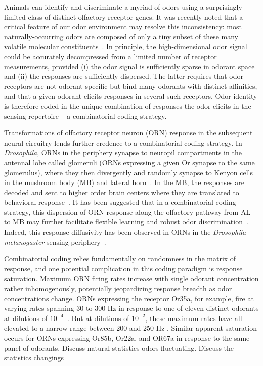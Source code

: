 
Animals can identify and discriminate a myriad of odors using a surprisingly limited class of distinct olfactory receptor genes. It was recently noted that a critical feature of our odor environment may resolve this inconsistency: most naturally-occurring odors are composed of only a tiny subset of these many volatile molecular constituents~\cite{vijay_1}. In principle, the high-dimensional odor signal could be accurately decompressed from a limited number of receptor measurements, provided (i) the odor signal is sufficiently sparse in odorant space and (ii) the responses are sufficiently dispersed. The latter requires that odor receptors are not odorant-specific but bind many odorants with distinct affinities, and that a given odorant elicits responses in several such receptors. Odor identity is therefore coded in the unique combination of responses the odor elicits in the sensing repertoire -- a combinatorial coding strategy. 

Transformations of olfactory receptor neuron (ORN) response in the subsequent neural circuitry lends further credence to a combinatorial coding strategy. In \textit{Drosophila}, ORNs in the periphery synapse to neuropil compartments in the antennal lobe called glomeruli (ORNs expressing a given Or synapse to the same glomerulus), where they then divergently and randomly synapse to Kenyon cells in the mushroom body (MB) and lateral horn~\cite{early_olfactory_processing, abbott_axel}. In the MB, the responses are decoded and sent to higher order brain centers where they are translated to behavioral response~\cite{olfactory_map_chiang, mushroom_body_review}. It has been suggested that in a combinatorial coding strategy, this dispersion of ORN response along the olfactory pathway from AL to MB may further facilitate flexible learning and robust odor discrimination~\cite{vijay_1}. Indeed, this response diffusivity has been observed in ORNs in the  \textit{Drosophila melanogaster} sensing periphery~\cite{hallem_carlson}. 

Combinatorial coding relies fundamentally on randomness in the matrix of response, and one potential complication in this coding paradigm is response saturation. Maximum ORN firing rates increase with single odorant concentration rather inhomogenously, potentially jeopardizing response breadth as odor concentrations change. ORNs expressing the receptor Or35a, for example, fire at varying rates spanning 30 to 300 Hz in response to one of eleven distinct odorants at dilutions of $10^{-4}$~\cite{hallem_carlson}. But at dilutions of $10^{-2}$, these maximum rates have all elevated to a narrow range between 200 and 250 Hz
. Similar apparent saturation occurs for ORNs expressing Or85b, Or22a, and OR67a in response to the same panel of odorants. {\color{blue} Discuss natural statistics odors fluctuating.} {\color{blue} Discuss the statistics changings}

